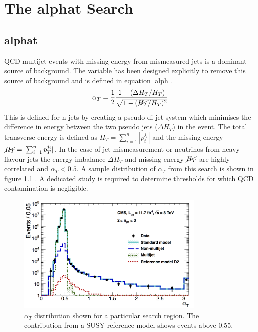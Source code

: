 
\chapter{The alphat Search} %

\label{Chapter2} %



\section{alphat}
QCD multijet events with missing energy from mismeasured jets is a dominant source of background\cite{randall}. The \alphat variable has been designed explicitly to remove this source of background and is defined in equation \ref{alph}.
\begin{equation}
\label{alph}
\alpha_T=\frac{1}{2}\frac{1-(\Delta H_T/H_T)}{\sqrt{1-(\cancel{H_T}/H_T)^2}}
\end{equation}
This is defined for n-jets by creating a pseudo di-jet system which minimises the difference in energy between the two pseudo jets ($\Delta H_T$) in the event. The total transverse energy is defined as $H_T=\sum_{i=1}^n|p_t^{j_i}|$ and the missing energy $\cancel{H_T}=|{\sum_{i=1}^n p_T^{j_i}}|$. In the case of jet mismeasurement or neutrinos from heavy flavour jets the energy imbalance $\Delta H_T$ and missing energy $\cancel{H_T}$ are highly correlated and $\alpha_T<0.5$. A sample distribution of $\alpha_T$ from this search is shown in figure \ref{alphdis} \cite{CMSAT8}. A dedicated study is required to determine \alphat thresholds for which QCD contamination is negligible.
\begin{figure}
\centering
    \includegraphics[width=0.8\textwidth]{Figures/sample_aT.jpg}
  \caption{$\alpha_T$ distribution shown for a particular search region. The contribution from a SUSY reference model shows events above 0.55.}
  \label{alphdis}
\end{figure}

